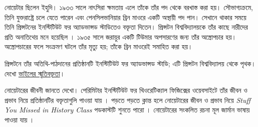 \documentclass[../../../include/open-logic-section]{subfiles}
\begin{document}
নোয়েটার ছিলেন ইহুদি। ১৯৩৩ সালে নাৎসিরা
ক্ষমতায় এলে তাঁকে তাঁর পদ থেকে বরখাস্ত করা
হয়। সৌভাগ্যক্রমে, তিনি যুক্তরাষ্ট্রে চলে যেতে
পারেন এবং পেনসিলভানিয়ার ব্রিন মাওরে একটি
অস্থায়ী পদ পান। সেখানে থাকার সময়ে তিনি
প্রিন্সটনের ইনস্টিটিউট ফর অ্যাডভান্সড স্টাডিতেও
বক্তৃতা দিতেন। প্রিন্সটন বিশ্ববিদ্যালয়কে
তাঁর কাছে নারীদের প্রতি অনাতিথেয় মনে হয়েছিল
\citep[81]{Dick1981}। ১৯৩৫ সালে জরায়ুর
একটি টিউমার অপসারণের জন্য তাঁর অস্ত্রোপচার
হয়। অস্ত্রোপচারের ফলে সংক্রমণ ঘটলে তাঁর মৃত্যু
হয়; তাঁকে ব্রিন মাওরেই সমাহিত করা হয়।

\par\smallskip\noindent প্রিন্সটনে তাঁর অতিথি-পাঠদানের প্রতিষ্ঠানটি ইনস্টিটিউট ফর অ্যাডভান্সড স্টাডি; এটি প্রিন্সটন বিশ্ববিদ্যালয় থেকে পৃথক। দেখো \href{https://celebratio.org/Noether_E/article/111/}{ভাইলের স্মৃতিবক্তৃতা}।

\begin{reading}
নোয়েটারের জীবনী জানতে \citet{Dick1981}
দেখো। পেরিমিটার ইনস্টিটিউট ফর থিওরেটিক্যাল
ফিজিক্সের ওয়েবসাইটে তাঁর জীবন ও প্রভাব নিয়ে
প্রতিষ্ঠানটির বক্তৃতাগুলি পাওয়া যায়
\citep{Perimeter2015}। পড়তে পড়তে ক্লান্ত
হলে নোয়েটারের জীবন ও প্রভাব নিয়ে
\emph{Stuff You Missed in History Class}
পডকাস্টটি শুনতে পারো \citep{Frey2015}।
নোয়েটারের সংকলিত রচনা মূল জার্মান ভাষায়
পাওয়া যায় \citep{Noether1983}।
\end{reading}
\end{document}
